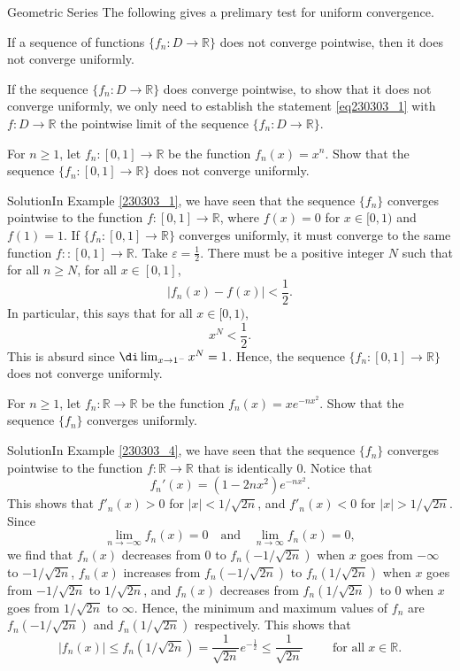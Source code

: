 \begin{example}[label=230305_16]{Geometric Series}
The following gives a prelimary test for uniform convergence.
\begin{proposition}{}
If a sequence of functions $\{f_n:D\to\mathbb{R}\}$ does not converge pointwise, then it does not converge uniformly. 
\end{proposition}
If the sequence $\{f_n:D\to\mathbb{R}\}$ does converge pointwise, to show that it does not converge uniformly, we only need to establish the statement \eqref{eq230303_1} with $f:D\to\mathbb{R}$ the pointwise limit of the  sequence $\{f_n:D\to\mathbb{R}\}$.


\begin{example}[label=230303_7]{}For $n\geq 1$, let $f_n:[0,1]\to\mathbb{R}$ be the function $f_n(x)=x^n$.
Show that the sequence $\{f_n:[0,1]\to\mathbb{R} \}$ does not converge uniformly. 
\end{example}
\begin{solution}{Solution}In Example \ref{230303_1}, we have seen that the sequence $\{f_n \}$ converges  pointwise to the function $f:[0,1]\to\mathbb{R}$, where $f(x)=0$ for $x\in [0,1)$ and $f(1)=1$. If $\{f_n:[0,1]\to\mathbb{R}\}$  converges  uniformly, it must converge to the same function $f::[0,1]\to\mathbb{R}$. Take $\varepsilon=\frac{1}{2}$. There must be a positive integer $N$ such that for all $n\geq N$, for all $x\in [0,1]$,
\[|f_n(x)-f(x)|<\frac{1}{2}.\]\bs
In particular, this says that for all $x\in [0,1)$,
\[x^N<\frac{1}{2}.\]
This is absurd since $\di\lim_{x\to 1^-}x^N=1$. Hence, the  sequence $\{f_n:[0,1]\to\mathbb{R} \}$ does not converge uniformly. 
\end{solution}

\begin{example}[label=230303_8]{}For $n\geq 1$, let $f_n:\mathbb{R}\to\mathbb{R}$ be the function $f_n(x)=xe^{-nx^2}$.
Show that the sequence $\{f_n \}$  converges uniformly. 
\end{example}
\begin{solution}{Solution}In Example \ref{230303_4}, we have seen that the sequence $\{f_n\}$ converges pointwise to the function $f:\mathbb{R}\to\mathbb{R}$ that is identically 0.
Notice that 
\[f_n'(x)=(1-2nx^2)e^{-nx^2}.\]
This shows that $f'_n(x)>0$ for $|x|<1/\sqrt{2n}$, and $f'_n(x)<0$ for $|x|>1/\sqrt{2n}$. Since
\[\lim_{n\to-\infty}f_n(x)=0\quad\text{and}\quad\lim_{n\to\infty}f_n(x)=0,\]we find that $f_n(x)$  decreases from $0$ to $f_n(-1/\sqrt{2n})$ when $x$ goes from $-\infty$ to $ -1/\sqrt{2n}$, $f_n(x)$ increases from $f_n(-1/\sqrt{2n})$  to $f_n(1/\sqrt{2n})$ when $x$ goes from $-1/\sqrt{2n}$ to $1/\sqrt{2n}$, and $f_n(x)$ decreases from $f_n(1/\sqrt{2n})$ to 0 when $x$ goes from $1/\sqrt{2n}$ to $\infty$. Hence, the minimum and maximum values of $f_n$ are  $f_n(-1/\sqrt{2n})$ and $f_n(1/\sqrt{2n})$ respectively.
This shows that
\[|f_n(x)|\leq f_n(1/\sqrt{2n})=\frac{1}{\sqrt{2n}}e^{-\frac{1}{2}}\leq \frac{1}{\sqrt{2n}}\hspace{1cm}\text{for all}\;x\in\mathbb{R}.\]


\end{solution}
\end{example}
